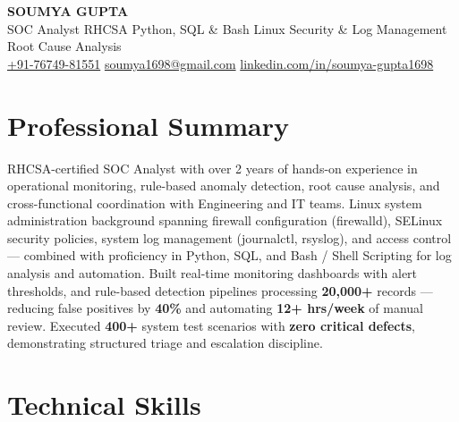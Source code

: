 \documentclass[10pt, letterpaper]{article}
\begin{document}

\begin{center}
  {\LARGE\bfseries SOUMYA GUPTA}\\[2pt]
  {\small\color{muted}SOC Analyst \textbar{} RHCSA \textbar{} Python, SQL \& Bash \textbar{} Linux Security \& Log Management \textbar{} Root Cause Analysis}\\[3pt]
  {\small
  \href{tel:+917674981551}{+91-76749-81551}\enspace\textbullet\enspace
  \href{mailto:soumya1698@gmail.com}{soumya1698@gmail.com}\enspace\textbullet\enspace
  \href{https://linkedin.com/in/soumya-gupta1698}{linkedin.com/in/soumya-gupta1698}}
\end{center}

\vspace{-2pt}

\section{Professional Summary}

RHCSA-certified SOC Analyst with over 2 years of hands-on experience in operational monitoring, rule-based anomaly detection, root cause analysis, and cross-functional coordination with Engineering and IT teams. Linux system administration background spanning firewall configuration (firewalld), SELinux security policies, system log management (journalctl, rsyslog), and access control — combined with proficiency in Python, SQL, and Bash / Shell Scripting for log analysis and automation. Built real-time monitoring dashboards with alert thresholds, and rule-based detection pipelines processing \textbf{20,000+} records — reducing false positives by \textbf{40\%} and automating \textbf{12+ hrs/week} of manual review. Executed \textbf{400+} system test scenarios with \textbf{zero critical defects}, demonstrating structured triage and escalation discipline.

\section{Technical Skills}
\end{document}
